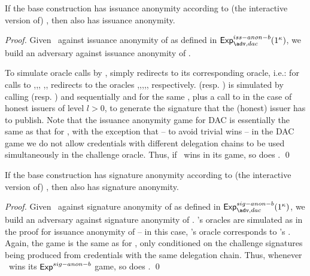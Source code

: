 \begin{theorem}
  If the base \CUASGenInt construction has issuance anonymity according to
  (the interactive version of) , then \CUASDAC
  also has issuance anonymity.
\end{theorem}

\begin{proof}
  Given \adv~against issuance anonymity of \CUASDAC as defined in
  $\Exp^{iss-anon-b}_{\adv,dac}(1^\secpar)$, we build an adversary \advB against
  issuance anonymity of \CUASGenInt.

  To simulate oracle calls by \adv, \advB simply redirects to its corresponding
  oracle, i.e.: for calls to ,,,
  ,, \advB redirects to the \CUASGenInt oracles
  \HUGEN,\CUGEN,\OBTAIN,\SIGN,\OBTCHALb, respectively.  (resp.
  ) is simulated by calling \HUGEN (resp. \CUGEN) and \ISET
  sequentially and for the same \uid, plus a call to \SIGN in the case of
  honest issuers of level $l>0$, to generate the signature \Sig that the
  (honest) issuer has to publish.
  Note that the issuance anonymity game for DAC is essentially the same as that
  for \UAS, with the exception that -- to avoid trivial wins -- in the DAC game
  we do not allow credentials with different delegation chains to be used
  simultaneously in the challenge oracle.
  Thus, if \adv~wins in its game, so does \advB.
  \qed
\end{proof}

\begin{theorem}
  If the base \CUASGenInt construction has signature anonymity according to
  (the interactive version of) , then \CUASDAC
  also has signature anonymity.
\end{theorem}

\begin{proof}
  Given \adv~against signature anonymity of \CUASDAC as defined in
  $\Exp^{sig-anon-b}_{\adv,dac}(1^\secpar)$, we build an adversary \advB against
  signature anonymity of \CUASGenInt.
  \adv's oracles are simulated as in the proof for issuance anonymity of
  \CUASDAC -- in this case, \adv's  oracle corresponds to \advB's
  \CHALb.
  Again, the game is the same as for \UAS, only conditioned on the challenge
  signatures being produced from credentials with the same delegation chain.
  Thus, whenever \adv~wins its $\mathsf{Exp}^{sig-anon-b}$ game, so does \advB.
  \qed
\end{proof}

